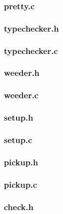 \documentclass[a4paper,10pt,titlepage]{report}
\begin{document}
\subsubsection{pretty.c}



\subsubsection{typechecker.h}


\subsubsection{typechecker.c}


\subsubsection{weeder.h}



\subsubsection{weeder.c}


\subsubsection{setup.h}


\subsubsection{setup.c}


\subsubsection{pickup.h}


\subsubsection{pickup.c}


\subsubsection{check.h}

\end{document}
